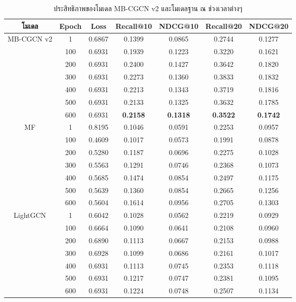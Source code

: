 \begin{table}[H]
\centering
\caption{ประสิทธิภาพของโมเดล MB-CGCN v2 และโมเดลฐาน ณ ช่วงเวลาต่างๆ}
\label{tab:ch4_42}
\small
\begin{tabular}{|c|c|c|c|c|c|c|}
\hline
\textbf{โมเดล} & \textbf{Epoch} & \textbf{Loss} & \textbf{Recall@10} & \textbf{NDCG@10} & \textbf{Recall@20} & \textbf{NDCG@20} \\ \hline
\multirow{7}{*}{MB-CGCN v2}
& 1 & 0.6867 & 0.1399 & 0.0865 & 0.2744 & 0.1277 \\ \cline{2-7}
& 100 & 0.6931 & 0.1939 & 0.1223 & 0.3220 & 0.1621 \\ \cline{2-7}
& 200 & 0.6931 & 0.2400 & 0.1427 & 0.3642 & 0.1820 \\ \cline{2-7}
& 300 & 0.6931 & 0.2273 & 0.1360 & 0.3833 & 0.1832 \\ \cline{2-7}
& 400 & 0.6931 & 0.2213 & 0.1343 & 0.3719 & 0.1816 \\ \cline{2-7}
& 500 & 0.6931 & 0.2133 & 0.1325 & 0.3632 & 0.1785 \\ \cline{2-7}
& 600 & 0.6931 & \textbf{0.2158} & \textbf{0.1318} & \textbf{0.3522} & \textbf{0.1742} \\ \hline
\multirow{7}{*}{MF}
& 1 & 0.8195 & 0.1046 & 0.0591 & 0.2253 & 0.0957 \\ \cline{2-7}
& 100 & 0.4609 & 0.1017 & 0.0573 & 0.1991 & 0.0878 \\ \cline{2-7}
& 200 & 0.5280 & 0.1187 & 0.0696 & 0.2275 & 0.1028 \\ \cline{2-7}
& 300 & 0.5563 & 0.1291 & 0.0746 & 0.2368 & 0.1073 \\ \cline{2-7}
& 400 & 0.5685 & 0.1474 & 0.0854 & 0.2497 & 0.1175 \\ \cline{2-7}
& 500 & 0.5639 & 0.1360 & 0.0854 & 0.2665 & 0.1256 \\ \cline{2-7}
& 600 & 0.5604 & 0.1614 & 0.0956 & 0.2705 & 0.1303 \\ \hline
\multirow{7}{*}{LightGCN}
& 1 & 0.6042 & 0.1028 & 0.0562 & 0.2219 & 0.0929 \\ \cline{2-7}
& 100 & 0.6664 & 0.1090 & 0.0641 & 0.2108 & 0.0960 \\ \cline{2-7}
& 200 & 0.6890 & 0.1113 & 0.0667 & 0.2153 & 0.0988 \\ \cline{2-7}
& 300 & 0.6928 & 0.1099 & 0.0686 & 0.2161 & 0.1017 \\ \cline{2-7}
& 400 & 0.6931 & 0.1113 & 0.0745 & 0.2353 & 0.1118 \\ \cline{2-7}
& 500 & 0.6931 & 0.1217 & 0.0747 & 0.2381 & 0.1095 \\ \cline{2-7}
& 600 & 0.6931 & 0.1224 & 0.0748 & 0.2507 & 0.1134 \\ \hline
\end{tabular}
\end{table}

